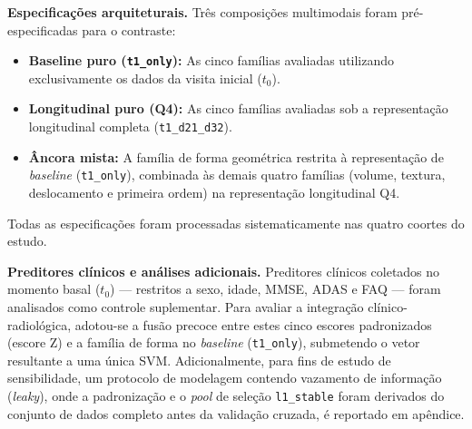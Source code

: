 \documentclass[review]{elsarticle}
\newcommand{\code}[1]{\texttt{#1}}
\begin{document}
\textbf{Especificações arquiteturais.} Três composições multimodais foram pré-especificadas para o contraste:
\begin{itemize}
	\item \textbf{Baseline puro (\code{t1\_only}):} As cinco famílias avaliadas utilizando exclusivamente os dados da visita inicial ($t_0$).
	\item \textbf{Longitudinal puro (Q4):} As cinco famílias avaliadas sob a representação longitudinal completa (\code{t1\_d21\_d32}).
	\item \textbf{Âncora mista:} A família de forma geométrica restrita à representação de \textit{baseline} (\code{t1\_only}), combinada às demais quatro famílias (volume, textura, deslocamento e primeira ordem) na representação longitudinal Q4.
\end{itemize}
Todas as especificações foram processadas sistematicamente nas quatro coortes do estudo.

\textbf{Preditores clínicos e análises adicionais.} Preditores clínicos coletados no momento basal ($t_0$) --- restritos a sexo, idade, MMSE, ADAS e FAQ --- foram analisados como controle suplementar. Para avaliar a integração clínico-radiológica, adotou-se a fusão precoce entre estes cinco escores padronizados (escore Z) e a família de forma no \textit{baseline} (\code{t1\_only}), submetendo o vetor resultante a uma única SVM. Adicionalmente, para fins de estudo de sensibilidade, um protocolo de modelagem contendo vazamento de informação (\emph{leaky}), onde a padronização e o \emph{pool} de seleção \code{l1\_stable} foram derivados do conjunto de dados completo antes da validação cruzada, é reportado em apêndice.
\end{document}
